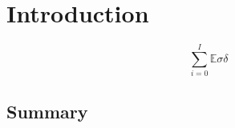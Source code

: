 \chapter{Introduction}
\blindtext
$$
\sum\limits_{i=0}^I \mathbb{E}\sigma \delta
$$


\section{Summary}
